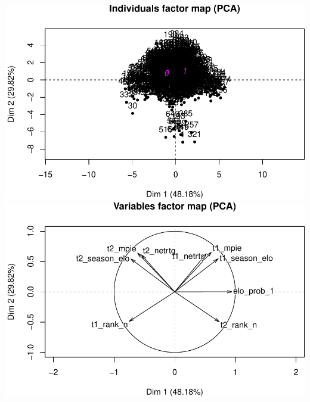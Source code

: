 \documentclass[]{article}
\begin{document}
\includegraphics{data_prep_files/figure-latex/unnamed-chunk-5-1.pdf}
\includegraphics{data_prep_files/figure-latex/unnamed-chunk-5-2.pdf}
\end{document}
